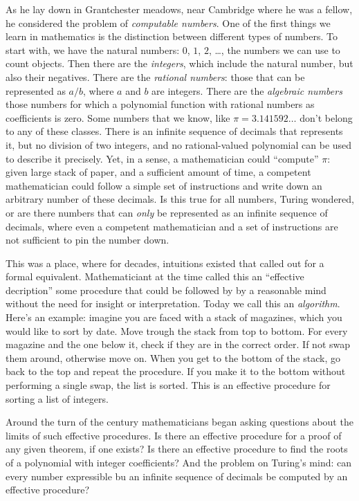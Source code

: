 As he lay down in Grantchester meadows, near Cambridge where he was a fellow, he considered the problem of \emph{computable numbers}. One of the first things we learn in mathematics is the distinction between different types of numbers. To start with, we have the natural numbers: $0$, $1$, $2$, \ldots, the numbers we can use to count objects. Then there are the \emph{integers}, which include the natural number, but also their negatives. There are the \emph{rational numbers}: those that can be represented as $a/b$, where $a$ and $b$ are integers. There are the \emph{algebraic numbers} those numbers for which a polynomial function with rational numbers as coefficients is zero. Some numbers that we know, like $\pi = 3.141592\ldots$ don't belong to any of these classes. There is an infinite sequence of decimals that represents it, but no division of two integers, and no rational-valued polynomial can be used to describe it precisely. Yet, in a sense, a mathematician could ``compute'' $\pi$: given large stack of paper, and a sufficient amount of time, a competent mathematician could follow a simple set of instructions and write down an arbitrary number of these decimals. Is this true for all numbers, Turing wondered, or are there numbers that can \emph{only} be represented as an infinite sequence of decimals, where even a competent mathematician and a set of instructions are not sufficient to pin the number down.

This was a place, where for decades, intuitions existed that called out for a formal equivalent. Mathematiciant at the time called this an ``effective decription'' some procedure that could be followed by by a reasonable mind without the need for insight or interpretation. Today we call this an \emph{algorithm}. Here's an example: imagine you are faced with a stack of magazines, which you would like to sort by date. Move trough the stack from top to bottom. For every magazine and the one below it, check if they are in the correct order. If not swap them around, otherwise move on. When you get to the bottom of the stack, go back to the top and repeat the procedure. If you make it to the bottom without performing a single swap, the list is sorted. This is an effective procedure for sorting a list of integers.

Around the turn of the century mathematicians began asking questions about the limits of such effective procedures. Is there an effective procedure for a proof of any given theorem, if one exists? Is there an effective procedure to find the roots of a polynomial with integer coefficients? And the problem on Turing's mind: can every number expressible bu an infinite sequence of decimals be computed by an effective procedure?

